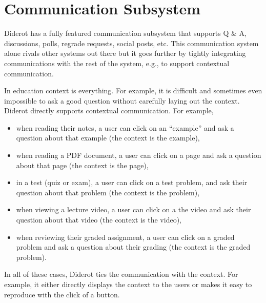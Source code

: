 \chapter{Communication Subsystem}
\label{ch:posts}

Diderot has a fully featured communication subsystem that supports Q \&
A, discussions, polls, regrade requests, social posts, etc.
%
This communication system alone rivals other systems out there but it
goes further by tightly integrating communications with the rest of
the system, e.g., to support contextual communication.

\begin{gram}
In education context is everything.
%
For example, it is difficult and sometimes even impossible to ask a
good question without carefully laying out the context.
%
Diderot directly supports contextual communication.
%  
For example,
\begin{itemize}
\item when reading their notes, a user can click on an
``example'' and ask a question about that example (the context is the example),
%

\item when reading a PDF document, a user can click on a page and
  ask a question about that page (the context is the page),

\item in a test (quiz or exam), a user can click on a test problem, and ask their question about that problem (the context is the problem),

\item when viewing a lecture video, a user can click on a the video
  and ask their question about that video (the context is the
  video),

\item when reviewing their graded assignment, a user can click on a graded problem and ask a question about their grading (the context is the graded problem).  
\end{itemize}
%
In all of these cases, Diderot ties the communication with the
context.  For example, it either directly displays the context to the
users or makes it easy to reproduce with the click of a button.
\end{gram}

